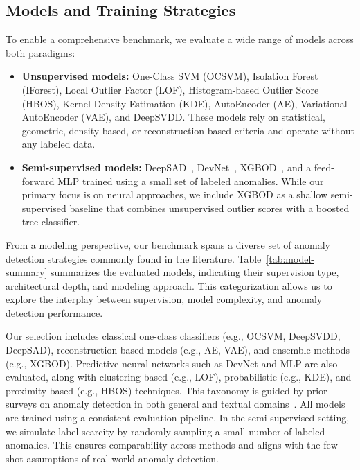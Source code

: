 \documentclass[12pt]{article}
\begin{document}
\subsection{Models and Training Strategies}

To enable a comprehensive benchmark, we evaluate a wide range of models across both paradigms:


\begin{itemize}
    \item \textbf{Unsupervised models:} One-Class SVM (OCSVM), Isolation Forest (IForest), Local Outlier Factor (LOF), Histogram-based Outlier Score (HBOS), Kernel Density Estimation (KDE), AutoEncoder (AE), Variational AutoEncoder (VAE), and DeepSVDD. These models rely on statistical, geometric, density-based, or reconstruction-based criteria and operate without any labeled data.

    \item \textbf{Semi-supervised models:} DeepSAD~\cite{Ruff2019}, DevNet~\cite{Pang2019}, XGBOD~\cite{XGBOD}, and a feed-forward MLP trained using a small set of labeled anomalies. While our primary focus is on neural approaches, we include XGBOD as a shallow semi-supervised baseline that combines unsupervised outlier scores with a boosted tree classifier.
\end{itemize}

From a modeling perspective, our benchmark spans a diverse set of anomaly detection strategies commonly found in the literature. Table~\ref{tab:model-summary} summarizes the evaluated models, indicating their supervision type, architectural depth, and modeling approach. This categorization allows us to explore the interplay between supervision, model complexity, and anomaly detection performance.

Our selection includes classical one-class classifiers (e.g., OCSVM, DeepSVDD, DeepSAD), reconstruction-based models (e.g., AE, VAE), and ensemble methods (e.g., XGBOD). Predictive neural networks such as DevNet and MLP are also evaluated, along with clustering-based (e.g., LOF), probabilistic (e.g., KDE), and proximity-based (e.g., HBOS) techniques. This taxonomy is guided by prior surveys on anomaly detection in both general and textual domains~\cite{pang2021deep, xu-etal-2023-comparative}. All models are trained using a consistent evaluation pipeline. In the semi-supervised setting, we simulate label scarcity by randomly sampling a small number of labeled anomalies. This ensures comparability across methods and aligns with the few-shot assumptions of real-world anomaly detection.
\end{document}
